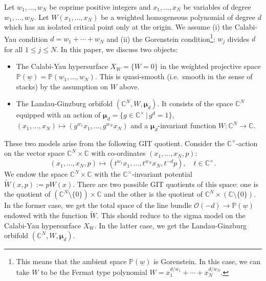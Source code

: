 \documentclass[11pt]{amsart}
\theoremstyle{definition} %
\theoremstyle{remark} %
\newcommand{\CC}{\mathbb C}
\newcommand{\PP}{\mathbb P}
\newcommand{\bmu}{\boldsymbol{\mu}}
\newcommand{\tW}{\widetilde{W}}
\newcommand{\cO}{\mathcal{O}}
\newcommand{\uw}{\underline{w}}
\begin{document}
Let $w_1,\dots, w_N$ be coprime positive integers 
and $x_1,\dots, x_N$ be variables of degree $w_1,\dots, w_N$.  
Let $W(x_1,\dots,x_N)$ be a weighted homogeneous polynomial 
of degree $d$ which has an isolated critical point only at the origin. 
We assume (i) the Calabi-Yau condition $d=w_1+\cdots+w_N$ 
and (ii) the Gorenstein condition\footnote
{This means that the ambient space $\PP(\uw)$ is Gorenstein. 
In this case, we can take $W$ to be the Fermat type polynomial 
$W=x_1^{d/w_1} + \cdots + x_N^{d/w_N}$.}: 
$w_j$ divides $d$ for all $1\le j\le N$. 
In this paper, we discuss two objects: 
\begin{itemize} 
\item The Calabi-Yau hypersurface $X_W=\{ W=0\}$ in 
the weighted projective space $\PP(\uw) = 
\PP(w_1,\dots, w_N)$. 
This is quasi-smooth (i.e.\ smooth in the sense of 
stacks) by the assumption on $W$ above. 

\item The Landau-Ginzburg orbifold $(\CC^N, W,\bmu_d)$. 
It consists of the space $\CC^N$ 
equipped with an action of 
$\bmu_d = \{g \in \CC^\times\, |\, g^d =1\}$, 
$(x_1,\dots, x_N) \mapsto (g^{w_1} x_1,\dots, g^{w_N} x_N)$ 
and a $\bmu_d$-invariant function $W\colon \CC^N \to \CC$.   
\end{itemize} 
These two models arise from the following GIT quotient.  
Consider the $\CC^\times$-action on the vector space 
$\CC^N \times \CC$ with co-ordinates $(x_1,\dots,x_N, p)$: 
\[
(x_1,\dots, x_N, p) \mapsto (t^{w_1} x_1,\dots, t^{w_N} x_N , t^{-d} p), 
\quad t \in \CC^\times.   
\]
We endow the space $\CC^N \times \CC$ with 
the $\CC^\times$-invariant potential $\tW(x,p) := p W(x)$. 
There are two possible GIT quotients of this space: 
one is the quotient of $(\CC^N \setminus \{0\}) \times \CC$ 
and the other is the quotient of 
$\CC^N \times (\CC\setminus \{0\})$. 
In the former case, we get the total space 
of the line bundle $\cO(-d)\to \PP(\uw)$ 
endowed with the function $\tW$. 
This should reduce to 
the sigma model on the Calabi-Yau hypersurface $X_W$. 
In the latter case, 
we get the Landau-Ginzburg orbifold $(\CC^N,W,\bmu_d)$.  
\end{document}
